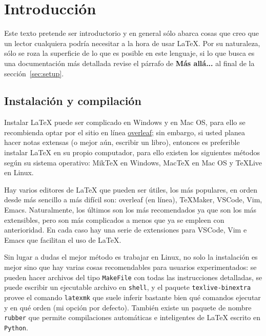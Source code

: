 \documentclass[intro-breve-latex.tex]{subfiles}
\begin{document}
\chapter{Introducción}
Este texto pretende ser introductorio y en general sólo abarca cosas que creo que un lector cualquiera podría necesitar a la hora de usar \LaTeX{}.
Por su naturaleza, sólo se roza la superficie de lo que es posible en este lenguaje, si lo que busca es una documentación más detallada revise el párrafo de \textbf{Más allá...} al final de la sección~\ref{sec:setup}.

\section*{Instalación y compilación}
Instalar \LaTeX{} puede ser complicado en Windows y en Mac OS, para ello se recombienda optar por el sitio en línea
\href{https://www.overleaf.com/}{\sffamily\color{newgreen}overleaf};
sin embargo, si usted planea hacer notas extensas (o mejor aún, escribir un libro), entonces es preferible instalar \LaTeX{} en su propio computador,
para ello existen los siguientes métodos según su sistema operativo:
Mik\TeX{} en Windows, Mac\TeX{} en Mac OS y \TeX{}Live en Linux.

Hay varios editores de \LaTeX{} que pueden ser útiles, los más populares, en orden desde más sencillo a más difícil son:
overleaf (en línea), \TeX{}Maker, VSCode, Vim, Emacs.
Naturalmente, los últimos son los más recomendados ya que son los más extensibles, pero son más complicados a menos que ya se empleen con anterioridad.
En cada caso hay una serie de extensiones para VSCode, Vim e Emacs que facilitan el uso de \LaTeX{}.

Sin lugar a dudas el mejor método es trabajar en Linux, no solo la instalación es mejor sino que hay varias cosas recomendables para usuarios
experimentados:
se pueden hacer archivos del tipo \texttt{MakeFile} con todas las instrucciones detalladas,
se puede escribir un ejecutable archivo en \texttt{shell},
y el paquete \texttt{texlive-binextra} provee el comando \texttt{latexmk} que suele inferir bastante bien qué comandos ejecutar y en qué orden (mi opción por defecto).
También existe un paquete de nombre \texttt{rubber} que permite compilaciones automáticas e inteligentes de \LaTeX{} escrito en \texttt{Python}.

\end{document}
